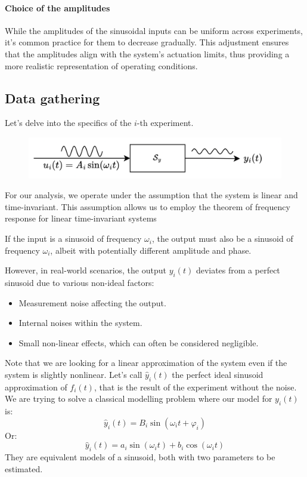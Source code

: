 \paragraph*{Choice of the amplitudes}
While the amplitudes of the sinusoidal inputs can be uniform across experiments, it's common practice for them to decrease gradually. 
This adjustment ensures that the amplitudes align with the system's actuation limits, thus providing a more realistic representation of operating conditions.

\subsection{Data gathering}
Let's delve into the specifics of the $i$-th experiment. 
\begin{figure}[H]
    \centering
    \includegraphics[width=0.6\linewidth]{images/exp1.png}
\end{figure}
For our analysis, we operate under the assumption that the system is linear and time-invariant. 
This assumption allows us to employ the theorem of frequency response for linear time-invariant systems
\begin{theorem}
    If the input is a sinusoid of frequency $\omega_i$, the output must also be a sinusoid of frequency $\omega_i$, albeit with potentially different amplitude and phase.
\end{theorem}
However, in real-world scenarios, the output $y_i(t)$ deviates from a perfect sinusoid due to various non-ideal factors:
\begin{itemize}
    \item Measurement noise affecting the output.
    \item Internal noises within the system.
    \item Small non-linear effects, which can often be considered negligible.
\end{itemize}
Note that we are looking for a linear approximation of the system even if the system is slightly nonlinear. 
Let's call $\hat{y}_i(t)$ the perfect ideal sinusoid approximation of $f_i(t)$, that is the result of the experiment without the noise. 
We are trying to solve a classical modelling problem where our model for $y_i(t)$ is:
\[\hat{y}_i(t)=B_i\sin\left(\omega_i t+\varphi_i\right)\]
Or: 
\[\hat{y}_i(t)=a_i\sin\left(\omega_i t\right)+b_i\cos\left(\omega_i t\right)\]
They are equivalent models of a sinusoid, both with two parameters to be estimated. 

